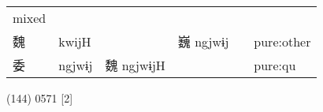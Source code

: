 \documentclass[14pt,a4paper]{scrartcl}
\begin{document}
\begin{longtable}[c]{@{}llllll@{}}
\begin{minipage}[t]{0.14\columnwidth}
mixed
\strut\end{minipage}\tabularnewline
\begin{minipage}[t]{0.14\columnwidth}\raggedright\strut
魏
\strut\end{minipage} &
\begin{minipage}[t]{0.14\columnwidth}\raggedright\strut
kwijH
\strut\end{minipage} &
\begin{minipage}[t]{0.14\columnwidth}\raggedright\strut
\strut\end{minipage} &
\begin{minipage}[t]{0.14\columnwidth}\raggedright\strut
巍 ngjwɨj
\strut\end{minipage} &
\begin{minipage}[t]{0.14\columnwidth}\raggedright\strut
\strut\end{minipage} &
\begin{minipage}[t]{0.14\columnwidth}\raggedright\strut
pure:other
\strut\end{minipage}\tabularnewline
\begin{minipage}[t]{0.14\columnwidth}\raggedright\strut
委
\strut\end{minipage} &
\begin{minipage}[t]{0.14\columnwidth}\raggedright\strut
ngjwɨj
\strut\end{minipage} &
\begin{minipage}[t]{0.14\columnwidth}\raggedright\strut
魏 ngjwɨjH
\strut\end{minipage} &
\begin{minipage}[t]{0.14\columnwidth}\raggedright\strut
\strut\end{minipage} &
\begin{minipage}[t]{0.14\columnwidth}\raggedright\strut
\strut\end{minipage} &
\begin{minipage}[t]{0.14\columnwidth}\raggedright\strut
pure:qu
\strut\end{minipage}\tabularnewline
\bottomrule
\end{longtable}

(144) 0571 {[}2{]}
\end{document}
